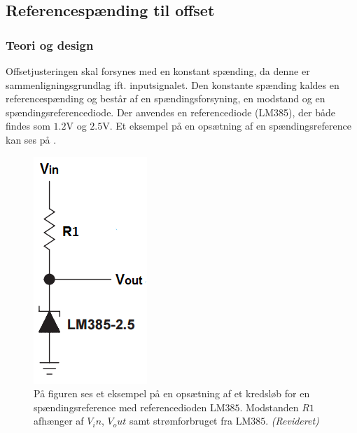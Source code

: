 \subsection{Referencespænding til offset}\label{subsec:Spaendingsref}
\subsubsection{Teori og design}
Offsetjusteringen skal forsynes med en konstant spænding, da denne er sammenligningsgrundlag ift. inputsignalet. Den konstante spænding kaldes en referencespænding og består af en spændingsforsyning, en modstand og en spændingsreferencediode. Der anvendes en referencediode (LM385), der både findes som $1.2$V og $2.5$V. Et eksempel på en opsætning af en spændingsreference kan ses på .

\begin{figure}[H]
	\centering
	\includegraphics[scale=0.7]{figures/cProblemloesning/ReferenceEksempel.PNG}
	\caption{På figuren ses et eksempel på en opsætning af et kredsløb for en spændingsreference med referencedioden LM$385$. Modstanden $R1$ afhænger af $V_in$, $V_out$ samt strømforbruget fra LM$385$. \textit{(Revideret)} \cite{Instruments2005}}
	\label{fig:Spaendingsreference}
\end{figure}

